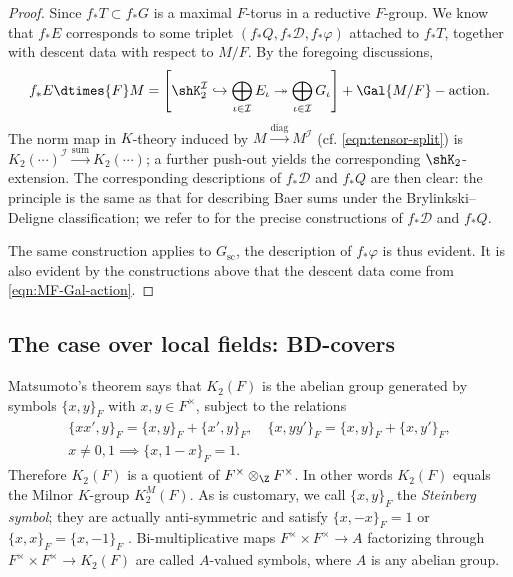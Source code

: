 \documentclass[a4paper,10pt]{article}
\begin{document}
\begin{proof}
	Since $f_* T \subset f_* G$ is a maximal $F$-torus in a reductive $F$-group. We know that $f_* E$ corresponds to some triplet $\left( f_* Q, f_* \mathcal{D}, f_* \varphi\right)$ attached to $f_* T$, together with descent data with respect to $M/F$. By the foregoing discussions,
	\[ f_* E \dtimes{F} M = \left[ \shK_2^\mathcal{I} \hookrightarrow \bigoplus_{\iota \in \mathcal{I}} E_\iota \twoheadrightarrow \bigoplus_{\iota \in \mathcal{I}} G_\iota \right] + \Gal{M/F}-\text{action}. \]
	The norm map in $K$-theory induced by $M \xrightarrow{\text{diag}} M^\mathcal{I}$ (cf. \eqref{eqn:tensor-split}) is $K_2(\cdots)^\mathcal{I} \xrightarrow{\text{sum}} K_2(\cdots)$; a further push-out yields the corresponding $\shK_2$-extension. The corresponding descriptions of $f_* \mathcal{D}$ and $f_* Q$ are then clear: the principle is the same as that for describing Baer sums under the Brylinkski--Deligne classification; we refer to \cite[\S 3]{BD01} for the precise constructions of $f_* \mathcal{D}$ and $f_* Q$.

	The same construction applies to $G_\text{sc}$, the description of $f_* \varphi$ is thus evident. It is also evident by the constructions above that the descent data come from \eqref{eqn:MF-Gal-action}.
\end{proof}

\subsection{The case over local fields: BD-covers}\label{sec:local-BD}
Matsumoto's theorem \cite[III.6.1]{Wei13} says that $K_2(F)$ is the abelian group generated by symbols $\{x,y\}_F$ with $x,y \in F^\times$, subject to the relations
\begin{gather*}
	\{xx', y \}_F = \{x,y\}_F + \{x',y\}_F , \quad \{x,yy'\}_F = \{x,y\}_F + \{x,y'\}_F , \\
	x \neq 0,1 \implies \{x,1-x\}_F = 1.
\end{gather*} 
Therefore $K_2(F)$ is a quotient of $F^\times \otimes_\Z F^\times$. In other words $K_2(F)$ equals the Milnor $K$-group $K_2^M(F)$. As is customary, we call $\{x,y\}_F$ the \emph{Steinberg symbol}; they are actually anti-symmetric and satisfy $\{x,-x\}_F = 1$ or $\{x,x\}_F = \{x, -1\}_F$ \cite[p.246]{Wei13}. Bi-multiplicative maps $F^\times \times F^\times \to A$ factorizing through $F^\times \times F^\times \to K_2(F)$ are called $A$-valued symbols, where $A$ is any abelian group.
\end{document}
